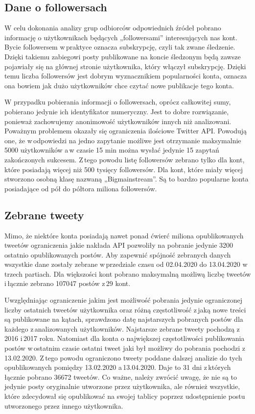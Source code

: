 \subsection{Dane o followersach}
W celu dokonania analizy grup odbiorców odpowiednich źródeł pobrano informację o użytkownikach będących „followersami” interesujących nas kont. Bycie followersem w\,praktyce oznacza subskrypcję, czyli tak zwane śledzenie. Dzięki takiemu zabiegowi posty publikowane na koncie śledzonym będą zawsze pojawiały się na głównej stronie użytkownika, który włączył subskrypcję. Dzięki temu liczba followersów jest dobrym wyznacznikiem popularności konta, oznacza ona bowiem jak dużo użytkowników chce czytać nowe publikacje tego konta. 
\par
W przypadku pobierania informacji o followersach, oprócz całkowitej sumy, pobierano jedynie ich identyfikator numeryczny. Jest to dobre rozwiązanie, ponieważ zachowujemy anonimowość użytkowników innych niż analizowani. Poważnym problemem okazały się ograniczenia ilościowe Twitter API. Powodują one, że w\,odpowiedzi na jedno zapytanie możliwe jest otrzymanie maksymalnie 5000 użytkowników a\,w czasie 15 min można wysłać jedynie 15 zapytań zakończonych sukcesem. Z\,tego powodu listę followersów zebrano tylko dla kont, które posiadają więcej niż 500 tysięcy followersów. Dla kont, które miały więcej stworzono osobną klasę nazwaną „Bigmainstream”. Są to bardzo popularne konta posiadające od pół do półtora miliona followersów. 
\subsection{Zebrane tweety}
Mimo, że niektóre konta posiadają nawet ponad ćwierć miliona opublikowanych tweetów ograniczenia jakie nakłada API pozwoliły na pobranie jedynie 3200 ostatnio opublikowanych postów. Aby zapewnić spójność zebranych danych wszystkie dane zostały zebrane w\,przedziale czasu od 02.04.2020 do 13.04.2020 w\,trzech partiach. Dla większości kont pobrano maksymalną możliwą liczbę tweetów i\,łącznie zebrano 107047 postów z\,29 kont. 
\par
Uwzględniając ograniczenie jakim jest możliwość pobrania jedynie ograniczonej liczby ostatnich tweetów użytkownika oraz różną częstotliwość z\,jaką nowe treści są publikowane na kątach, sprawdzono datę najstarszych pobranych postów dla każdego z\,analizowanych użytkowników. Najstarsze zebrane tweety pochodzą z\,2016 i\,2017 roku.  Natomiast dla konta o największej częstotliwości publikowania postów w\,ostatnim czasie ostatni tweet jaki był możliwy do pobrania pochodzi z\,13.02.2020. Z\,tego powodu ograniczono tweety poddane dalszej analizie do tych opublikowanych pomiędzy 13.02.2020 a\,13.04.2020. Daje to 31 dni z\,których łącznie pobrano 36672 tweetów. Co ważne, należy zwrócić uwagę, że nie są to jedynie posty oryginalnie utworzone przez użytkownika, ale również wszystkie, które zdecydował się opublikować na swojej tablicy poprzez udostępnienie postu utworzonego przez innego użytkownika. 

